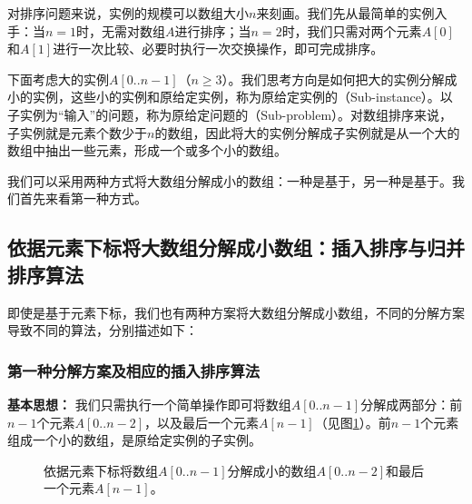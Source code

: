   对排序问题来说，实例的规模可以数组大小$n$来刻画。我们先从最简单的实例入手：当$n=1$时，无需对数组$A$进行排序；当$n=2$时，我们只需对两个元素$A[0]$和$A[1]$进行一次比较、必要时执行一次交换操作，即可完成排序。
  
  下面考虑大的实例$A[0..n-1]$（$n\geq 3$）。我们思考方向是如何把大的实例分解成小的实例，这些小的实例和原给定实例，称为原给定实例的（Sub-instance）。以子实例为“输入”的问题，称为原给定问题的（Sub-problem）。对数组排序来说，子实例就是元素个数少于$n$的数组，因此将大的实例分解成子实例就是从一个大的数组中抽出一些元素，形成一个或多个小的数组。

我们可以采用两种方式将大数组分解成小的数组：一种是基于，另一种是基于。我们首先来看第一种方式。

\subsection{依据元素下标将大数组分解成小数组：插入排序与归并排序算法}

即使是基于元素下标，我们也有两种方案将大数组分解成小数组，不同的分解方案导致不同的算法，分别描述如下：	
\subsubsection*{第一种分解方案及相应的插入排序算法}


{\bf 基本思想：} 我们只需执行一个简单操作即可将数组$A[0..n-1]$分解成两部分：前$n-1$个元素$A[0..n-2]$，以及最后一个元素$A[n-1]$（见图\ref{An}）。前$n-1$个元素组成一个小的数组，是原给定实例的子实例。
    
    \begin{figure}[H]\centering
	\caption{\fangsong 依据元素下标将数组$A[0..n-1]$分解成小的数组$A[0..n-2]$和最后一个元素$A[n-1]$。}	
	\label{An}
\end{figure}

